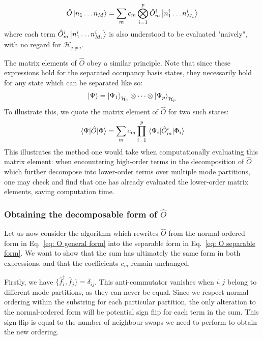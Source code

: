 \documentclass[12pt]{article}
\newcommand{\hc}{^\dagger}
\begin{document}
	\begin{equation}
	\hat{O} \ket{n_1 \dots n_M} = \sum_m c_m \bigotimes_{i = 1}^p \hat{O}^i_m \ket{n^i_1 \dots n^i_{M_i}}
	\end{equation}
	where each term $\hat{O}^i_m \ket{n^i_1 \dots n^i_{M_i}}$ is also understood to be evaluated "naively", with no regard for $\mathcal{H}_{j\neq i}$.
	
	The matrix elements of $\hat{O}$ obey a similar principle. Note that since these expressions hold for the separated occupancy basis states, they necessarily hold for any state which can be separated like so:
	\begin{equation}
	\ket{\Psi} = \ket{\Psi_1}_{\mathcal{H}_1} \otimes \dots \otimes \ket{\Psi_p}_{\mathcal{H}_p}
	\end{equation}
	To illustrate this, we quote the matrix element of $\hat{O}$ for two such states:
	\begin{equation}
	\mel{\Psi}{\hat{O}}{\Phi} = \sum_m c_m \prod_{i = 1}^p \mel{\Psi_i}{\hat{O}^i_m}{\Phi_i}
	\end{equation}
	This illustrates the method one would take when computationally evaluating this matrix element: when encountering high-order terms in the decomposition of $\hat{O}$ which further decompose into lower-order terms over multiple mode partitions, one may check and find that one has already evaluated the lower-order matrix elements, saving computation time.
	
	\subsubsection{Obtaining the decomposable form of $\hat{O}$} \label{sec: decomposing O}
	
	Let us now consider the algorithm which rewrites $\hat{O}$ from the normal-ordered form in Eq.~\eqref{eq: O general form} into the separable form in Eq.~\eqref{eq: O separable form}. We want to show that the sum has ultimately the same form in both expressions, and that the coefficients $c_m$ remain unchanged.
	
	Firstly, we have $\{\hat{f}_i\hc, \hat{f}_j\} =\delta_{ij}$. This anti-commutator vanishes when $i, j$ belong to different mode partitions, as they can never be equal. Since we respect normal-ordering within the substring for each particular partition, the only alteration to the normal-ordered form will be potential sign flip for each term in the sum. This sign flip is equal to the number of neighbour swaps we need to perform to obtain the new ordering.
	
\end{document}
